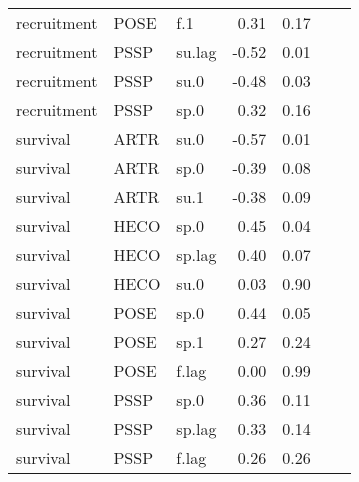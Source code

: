 \begin{table}[ht]
\begin{tabular}{lllrrll}
  recruitment & POSE & f.1 & 0.31 & 0.17 &  &  \\ 
  recruitment & PSSP & su.lag & -0.52 & 0.01 &  &  \\ 
  recruitment & PSSP & su.0 & -0.48 & 0.03 &  &  \\ 
  recruitment & PSSP & sp.0 & 0.32 & 0.16 &  &  \\ 
  survival & ARTR & su.0 & -0.57 & 0.01 &  &  \\ 
  survival & ARTR & sp.0 & -0.39 & 0.08 &  &  \\ 
  survival & ARTR & su.1 & -0.38 & 0.09 &  &  \\ 
  survival & HECO & sp.0 & 0.45 & 0.04 &  &  \\ 
  survival & HECO & sp.lag & 0.40 & 0.07 &  &  \\ 
  survival & HECO & su.0 & 0.03 & 0.90 &  &  \\ 
  survival & POSE & sp.0 & 0.44 & 0.05 &  &  \\ 
  survival & POSE & sp.1 & 0.27 & 0.24 &  &  \\ 
  survival & POSE & f.lag & 0.00 & 0.99 &  &  \\ 
  survival & PSSP & sp.0 & 0.36 & 0.11 &  &  \\ 
  survival & PSSP & sp.lag & 0.33 & 0.14 &  &  \\ 
  survival & PSSP & f.lag & 0.26 & 0.26 &  &  \\ 
   \hline
\end{tabular}
\end{table}
